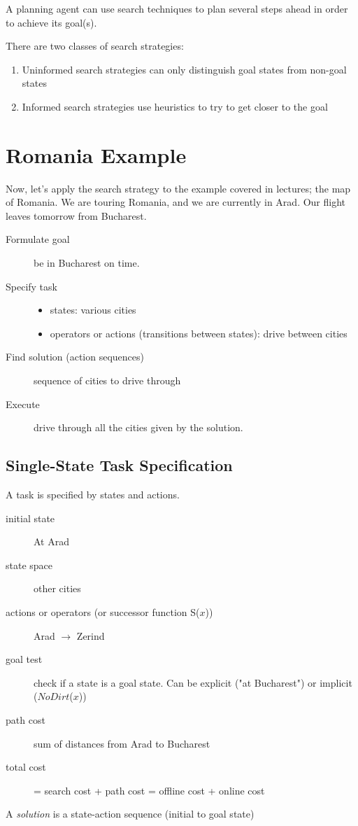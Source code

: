 A planning agent can use search techniques to plan several steps ahead in order
to achieve its goal(s).

There are two classes of search strategies:
\begin{enumerate}
    \item Uninformed search strategies can only distinguish goal states from
    non-goal states
    \item Informed search strategies use heuristics to try to get closer to the
    goal
\end{enumerate}

\section{Romania Example}
Now, let's apply the search strategy to the example covered in lectures; the
map of Romania. We are touring Romania, and we are currently in Arad. Our
flight leaves tomorrow from Bucharest.
\begin{description}
    \item[Formulate goal] be in Bucharest on time.
    \item[Specify task]\hfill
        \begin{itemize}
            \item states: various cities
            \item operators or actions (transitions between states): drive between cities
        \end{itemize}
    \item[Find solution (action sequences)] sequence of cities to drive through
    \item[Execute] drive through all the cities given by the solution.
\end{description}

\subsection{Single-State Task Specification}
A task is specified by states and actions.
\begin{description}
    \item[initial state] At Arad
    \item[state space] other cities
    \item[actions or operators (or successor function S($x$))] Arad
    $\rightarrow$ Zerind
    \item[goal test] check if a state is a goal state. Can be explicit ("at
    Bucharest") or implicit ($NoDirt$($x$))
    \item[path cost] sum of distances from Arad to Bucharest
    \item[total cost] = search cost + path cost = offline cost + online cost
\end{description}
A \textit{solution} is a state-action sequence (initial to goal state)

